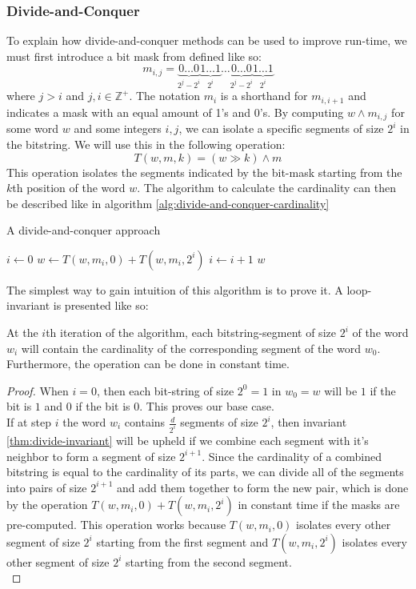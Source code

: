 \subsubsection{Divide-and-Conquer}
To explain how divide-and-conquer methods can be used to improve run-time, we must first introduce a bit mask from \cite{fast-similarity-search} defined like so:
$$m_{i,j} = \underbrace{0\dots 0}_{2^{j}-2^{i}}\underbrace{1\dots 1}_{2^i}\dots\underbrace{0\dots 0}_{2^{j}-2^{i}}\underbrace{1\dots 1}_{2^i}$$
where $j > i$ and $j, i \in \mathbb{Z}^+$. The notation $m_{i}$ is a shorthand for $m_{i, i+1}$ and indicates a mask with an equal amount of 1's and 0's. By computing $w \land m_{i,j}$ for some word $w$ and some integers $i, j$, we can isolate a specific segments of size $2^i$ in the bitstring.
We will use this in the following operation:
\begin{equation}
    T(w, m, k) = (w\gg k) \land m
\end{equation}
This operation isolates the segments indicated by the bit-mask starting from the $k$th position of the word $w$.
The algorithm to calculate the cardinality can then be described like in algorithm \ref{alg:divide-and-conquer-cardinality}
\begin{algorithm}[H]
\caption{A divide-and-conquer approach}\label{alg:divide-and-conquer-cardinality}
\begin{algorithmic}
 
\State $i \gets 0$
\State $w \gets T(w, m_i, 0) + T(w, m_i, 2^i)$
\State $i \gets i + 1$
\EndWhile
\State \Return $w$
\EndFunction
\end{algorithmic}
\end{algorithm}
The simplest way to gain intuition of this algorithm is to prove it. A loop-invariant is presented like so:
\begin{invariant}
\label{thm:divide-invariant}
At the $i$th iteration of the algorithm, each bitstring-segment of size $2^i$ of the word $w_i$ will contain the cardinality of the corresponding segment of the word $w_0$. Furthermore, the operation can be done in constant time.
\end{invariant}
\begin{proof}
    When $i=0$, then each bit-string of size $2^0=1$ in $w_0 = w$ will be $1$ if the bit is $1$ and $0$ if the bit is $0$. This proves our base case. \\
    If at step $i$ the word $w_i$ contains $\frac{d}{2^i}$ segments of size $2^i$, then invariant \ref{thm:divide-invariant} will be upheld if we combine each segment with it's neighbor to form a segment of size $2^{i+1}$. Since the cardinality of a combined bitstring is equal to the cardinality of its parts, we can divide all of the segments into pairs of size $2^{i+1}$ and add them together to form the new pair, which is done by the operation $T(w, m_i, 0) + T(w, m_i, 2^i)$ in constant time if the masks are pre-computed. This operation works because $T(w, m_i, 0)$ isolates every other segment of size $2^i$ starting from the first segment and $T(w, m_i, 2^i)$ isolates every other segment of size $2^i$ starting from the second segment.\\
\end{proof}
